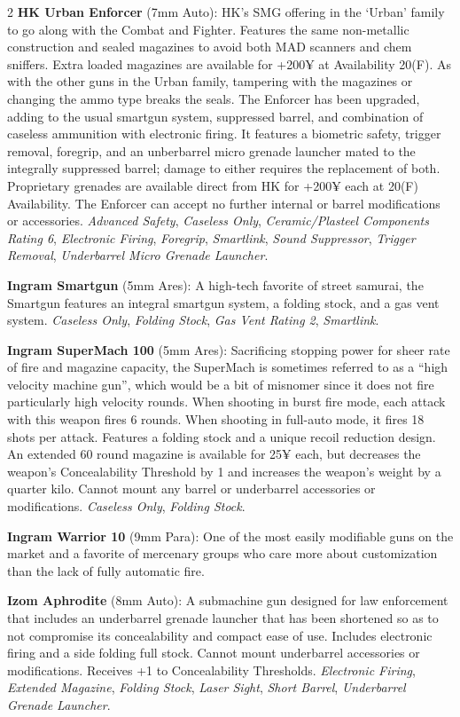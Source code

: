 \documentclass[
  oneside]{article}
\begin{document}
\begin{multicols}{2}
\textbf{HK Urban Enforcer} (7mm Auto): HK's SMG
offering in the `Urban' family to go along with
the Combat and Fighter. Features the same
non-metallic construction and sealed magazines to
avoid both MAD scanners and chem sniffers. Extra
loaded magazines are available for +200¥ at
Availability 20(F). As with the other guns in the
Urban family, tampering with the magazines or
changing the ammo type breaks the seals. The
Enforcer has been upgraded, adding to the usual
smartgun system, suppressed barrel, and
combination of caseless ammunition with electronic
firing. It features a biometric safety, trigger
removal, foregrip, and an unberbarrel micro
grenade launcher mated to the integrally
suppressed barrel; damage to either requires the
replacement of both. Proprietary grenades are
available direct from HK for +200¥ each at 20(F)
Availability. The Enforcer can accept no further
internal or barrel modifications or accessories.
\emph{Advanced Safety}, \emph{Caseless Only},
\emph{Ceramic/Plasteel Components Rating 6},
\emph{Electronic Firing}, \emph{Foregrip},
\emph{Smartlink}, \emph{Sound Suppressor},
\emph{Trigger Removal}, \emph{Underbarrel Micro
Grenade Launcher}.

\textbf{Ingram Smartgun} (5mm Ares): A high-tech
favorite of street samurai, the Smartgun features
an integral smartgun system, a folding stock, and
a gas vent system. \emph{Caseless Only},
\emph{Folding Stock}, \emph{Gas Vent Rating 2},
\emph{Smartlink}.

\textbf{Ingram SuperMach 100} (5mm Ares):
Sacrificing stopping power for sheer rate of fire
and magazine capacity, the SuperMach is sometimes
referred to as a ``high velocity machine gun'',
which would be a bit of misnomer since it does not
fire particularly high velocity rounds. When
shooting in burst fire mode, each attack with this
weapon fires 6 rounds. When shooting in full-auto
mode, it fires 18 shots per attack. Features a
folding stock and a unique recoil reduction
design. An extended 60 round magazine is available
for 25¥ each, but decreases the weapon's
Concealability Threshold by 1 and increases the
weapon's weight by a quarter kilo. Cannot mount
any barrel or underbarrel accessories or
modifications. \emph{Caseless Only}, \emph{Folding
Stock}.

\textbf{Ingram Warrior 10} (9mm Para): One of the
most easily modifiable guns on the market and a
favorite of mercenary groups who care more about
customization than the lack of fully automatic
fire.

\textbf{Izom Aphrodite} (8mm Auto): A submachine
gun designed for law enforcement that includes an
underbarrel grenade launcher that has been
shortened so as to not compromise its
concealability and compact ease of use. Includes
electronic firing and a side folding full stock.
Cannot mount underbarrel accessories or
modifications. Receives +1 to Concealability
Thresholds. \emph{Electronic Firing},
\emph{Extended Magazine}, \emph{Folding Stock},
\emph{Laser Sight}, \emph{Short Barrel},
\emph{Underbarrel Grenade Launcher}.


\end{multicols}
\end{document}
